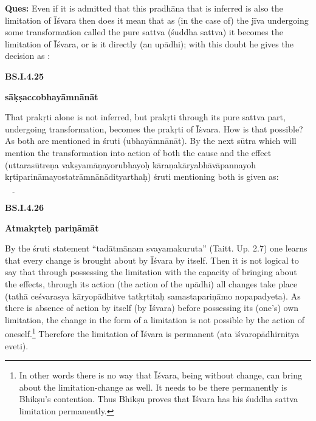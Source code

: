 \textbf{Ques:} Even if it is admitted that this pradhāna that is inferred is also the limitation of Īśvara then does it mean that as (in the case of) the jīva undergoing some transformation called the pure sattva (śuddha sattva) it becomes the limitation of Īśvara, or is it directly (an upādhi); with this doubt he gives the decision as : 

\smallskip

\textbf{}



\smallskip

\textbf{BS.I.4.25}

\textbf{sāḳṣaccobhayāmnānāt}

That prakṛti alone is not inferred, but prakṛti through its pure sattva part, undergoing transformation, becomes the prakṛti of Īṡvara. How is that possible? As both are mentioned in śruti (ubhayāmnānāt). By the next sūtra which will mention the transformation into action of both the cause and the effect (uttarasūtreṇa vakṣyamāṇayorubhayoḥ kāraṇakāryabhāvāpannayoh kṛtiparināmayostatrāmnānādityarthaḥ) śruti mentioning both is given as:

\smallskip

\textbf{}


 $\underline{\qquad}$

\smallskip

\textbf{BS.I.4.26}

\textbf{Ātmakṛteḥ pariṇāmāt}

\vskip 2pt

By the śruti statement “tadātmānam svayamakuruta” (Taitt. Up. 2.7) one learns that every change is brought about by Īśvara by itself. Then it is not logical to say that through possessing the limitation with the capacity of bringing about the effects, through its action (the action of the upādhi) all changes take place (tathā ceśvarasya kāryopādhitve tatkṛtitaḥ samastapariṇāmo nopapadyeta). As there is absence of action by itself (by Īśvara) before possessing its (one’s) own limitation, the change in the form of a limitation is not possible by the action of oneself.\footnote{In other words there is no way that Īśvara, being without change, can bring about the limitation-change  as well. It needs to be there permanently is Bhikṣu’s contention. Thus Bhikṣu proves that Īśvara has his śuddha sattva limitation permanently.} Therefore the limitation of Īśvara is permanent (ata īśvaropādhirnitya eveti).

